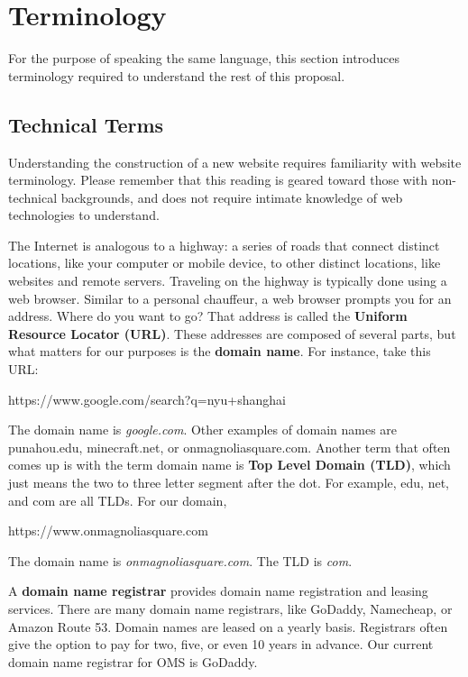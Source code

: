 \section{Terminology}
For the purpose of speaking the same language, this section introduces terminology required to understand the rest of this proposal.

\subsection{Technical Terms}
Understanding the construction of a new website requires familiarity with website terminology. Please remember that this reading is geared toward those with non-technical backgrounds, and does not require intimate knowledge of web technologies to understand.

The Internet is analogous to a highway: a series of roads that connect distinct locations, like your computer or mobile device, to other distinct locations, like websites and remote servers. Traveling on the highway is typically done using a web browser. Similar to a personal chauffeur, a web browser prompts you for an address. Where do you want to go? That address is called the \textbf{Uniform Resource Locator (URL)}. These addresses are composed of several parts, but what matters for our purposes is the \textbf{domain name}. For instance, take this URL\@:

\begin{center}
    https://www.google.com/search?q=nyu+shanghai
\end{center}

The domain name is \textit{google.com}. Other examples of domain names are punahou.edu, minecraft.net, or onmagnoliasquare.com. Another term that often comes up is with the term domain name is \textbf{Top Level Domain (TLD)}, which just means the two to three letter segment after the dot. For example, edu, net, and com are all TLDs. For our domain,

\begin{center}
    https://www.onmagnoliasquare.com
\end{center}

The domain name is \textit{onmagnoliasquare.com}. The TLD is \textit{com}.

A \textbf{domain name registrar} provides domain name registration and leasing services. There are many domain name registrars, like GoDaddy, Namecheap, or Amazon Route 53. Domain names are leased on a yearly basis. Registrars often give the option to pay for two, five, or even 10 years in advance. Our current domain name registrar for OMS is GoDaddy.


